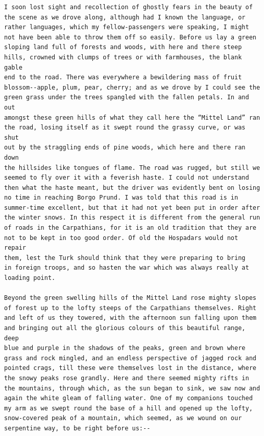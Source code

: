 \documentclass{article}
\begin{document}
\begin{verbatim}
I soon lost sight and recollection of ghostly fears in the beauty of
the scene as we drove along, although had I known the language, or
rather languages, which my fellow-passengers were speaking, I might
not have been able to throw them off so easily. Before us lay a green
sloping land full of forests and woods, with here and there steep
hills, crowned with clumps of trees or with farmhouses, the blank gable
end to the road. There was everywhere a bewildering mass of fruit
blossom--apple, plum, pear, cherry; and as we drove by I could see the
green grass under the trees spangled with the fallen petals. In and out
amongst these green hills of what they call here the “Mittel Land” ran
the road, losing itself as it swept round the grassy curve, or was shut
out by the straggling ends of pine woods, which here and there ran down
the hillsides like tongues of flame. The road was rugged, but still we
seemed to fly over it with a feverish haste. I could not understand
then what the haste meant, but the driver was evidently bent on losing
no time in reaching Borgo Prund. I was told that this road is in
summer-time excellent, but that it had not yet been put in order after
the winter snows. In this respect it is different from the general run
of roads in the Carpathians, for it is an old tradition that they are
not to be kept in too good order. Of old the Hospadars would not repair
them, lest the Turk should think that they were preparing to bring
in foreign troops, and so hasten the war which was always really at
loading point.

Beyond the green swelling hills of the Mittel Land rose mighty slopes
of forest up to the lofty steeps of the Carpathians themselves. Right
and left of us they towered, with the afternoon sun falling upon them
and bringing out all the glorious colours of this beautiful range, deep
blue and purple in the shadows of the peaks, green and brown where
grass and rock mingled, and an endless perspective of jagged rock and
pointed crags, till these were themselves lost in the distance, where
the snowy peaks rose grandly. Here and there seemed mighty rifts in
the mountains, through which, as the sun began to sink, we saw now and
again the white gleam of falling water. One of my companions touched
my arm as we swept round the base of a hill and opened up the lofty,
snow-covered peak of a mountain, which seemed, as we wound on our
serpentine way, to be right before us:--


\end{verbatim}
\end{document}
